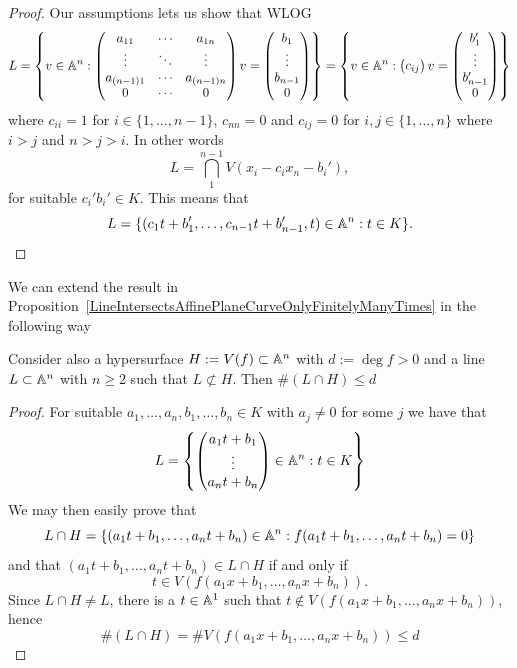 \begin{proof}
    Our assumptions lets us show that WLOG
    \begin{align*}
        L = \left\{ v\in \mathbb{A}^n : \begin{pmatrix}
            a_{11} & \cdots & a_{1n}\\
            \vdots & \ddots & \vdots\\
            a_{(n-1) 1} & \cdots & a_{(n-1) n}\\
            0 & \cdots & 0
        \end{pmatrix} v = \begin{pmatrix} b_1\\ \vdots\\ b_{n-1} \\0 \end{pmatrix}\right\} = \left\{ v\in \mathbb{A}^n : \begin{pmatrix}
            c_{ij} 
        \end{pmatrix} v = \begin{pmatrix}
            b_1' \\ \vdots \\ b_{n-1}' \\0
        \end{pmatrix} \right\} 
    \end{align*}
    where $c_{ii} = 1$ for $i\in \{1,\dots, n-1\}$, $c_{nn}=0$ and $c_{ij}=0$ for $i,j\in \{1,\dots,n\}$ where $i>j$ and $n>j>i$. In other words 
    $$L = \bigcap_1^{n-1} V(x_i-c_ix_n-b_i'),$$
    for suitable $c_i'b_i'\in K$. This means that 
    $$L = \{(c_1t+b_1',\dots,c_{n-1}t+b_{n-1}',t) \in \mathbb{A}^n : t \in K\}.$$   
\end{proof}
We can extend the result in Proposition~\ref{LineIntersectsAffinePlaneCurveOnlyFinitelyManyTimes} in the following way
\begin{proposition}\label{NumberOfIntersectionsOfAlgebraicSetWithLine}
     Consider also a hypersurface $H:=V(f)\subset \mathbb{A}^n$ with $d:=\deg f >0$ and a line $L\subset \mathbb{A}^n$ with $n\geq 2$ such that $L\not\subset H$. Then $\#(L\cap H) \leq d$ 
\end{proposition}
\begin{proof}
    For suitable $a_1,\dots,a_n,b_1,\dots,b_n\in K$ with $a_j\neq 0$ for some $j$ we have that 
    $$ L = \left\{ \begin{pmatrix}
        a_1t+b_1\\ \vdots\\ a_nt+b_n
    \end{pmatrix}\in \mathbb{A}^n : t\in K \right\}$$
    We may then easily prove that 
    $$L \cap H = \left\{ (a_1t+b_1,\dots,a_nt+b_n)\in \mathbb{A}^n : f(a_1t+b_1,\dots,a_nt+b_n)= 0 \right\}$$
    and that $(a_1t+b_1,\dots,a_nt+b_n)\in L\cap H$ if and only if 
    $$t \in V(f(a_1x+b_1,\dots,a_nx+b_n)).$$
    Since $L \cap H \neq L$, there is a $t \in \mathbb{A}^1$ such that $t \notin V(f(a_1x+b_1,\dots,a_nx+b_n))$, hence
    $$\#(L\cap H) = \#V(f(a_1x+b_1,\dots,a_nx+b_n)) \leq d$$
\end{proof}
